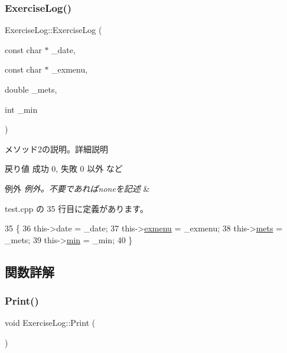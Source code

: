 \subsubsection{\texorpdfstring{Exercise\+Log()}{ExerciseLog()}}
{\footnotesize\ttfamily Exercise\+Log\+::\+Exercise\+Log (\begin{DoxyParamCaption}\item[{const char $\ast$}]{\+\_\+date,  }\item[{const char $\ast$}]{\+\_\+exmenu,  }\item[{double}]{\+\_\+mets,  }\item[{int}]{\+\_\+min }\end{DoxyParamCaption})\hspace{0.3cm}{\ttfamily [inline]}}

メソッド2の説明。詳細説明 \begin{DoxyReturn}{戻り値}
成功 0, 失敗 0 以外 など 
\end{DoxyReturn}

\begin{DoxyExceptions}{例外}
{\em 例外。不要であればnoneを記述} & \\
\hline
\end{DoxyExceptions}


 test.\+cpp の 35 行目に定義があります。


\begin{DoxyCode}
35                                                                                 \{
36         this->date = \_date;
37         this->\hyperlink{class_exercise_log_aa7d8e7d8b226d049d279912b9fc0fd5b}{exmenu} = \_exmenu;
38         this->\hyperlink{class_exercise_log_a511c5c637f86192270d0588fd7b0c5ee}{mets} = \_mets;
39         this->\hyperlink{class_exercise_log_a9fc8d465bb5d443970799bafd82441a4}{min} = \_min;
40     \}
\end{DoxyCode}


\subsection{関数詳解}
\mbox{\label{class_exercise_log_aba1a88ed0b4e6d17843cab673210942c}} 
\subsubsection{\texorpdfstring{Print()}{Print()}}
{\footnotesize\ttfamily void Exercise\+Log\+::\+Print (\begin{DoxyParamCaption}{ }\end{DoxyParamCaption})\hspace{0.3cm}{\ttfamily [inline]}}

